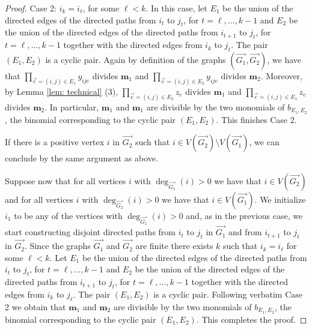 \documentclass[11pt]{article}
\theoremstyle{definition}
\numberwithin{equation}{section}
\begin{document}
\begin{proof}
     {\sf Case 2:} $i_k=i_{\ell}$, for some ${\ell}<k$. In this case, let $E_1$ be the union of the directed edges of the directed paths from $i_{t}$ to $j_{t}$, for $t=\ell,\dots,k-1$ and $E_2$ be the union of the directed edges of the directed paths from $i_{t+1}$ to $j_t$, for $t=\ell,\dots,k-1$ together with the directed edges from $i_{k}$ to $j_{\ell}$. The pair $(E_1,E_2)$ is a cyclic pair. Again by definition of the graphs $(\overrightarrow{G_1},\overrightarrow{G_2})$, we have that $\prod_{\overset{\to}{e}=(i,j)\in E_1}y_{ije}$ divides $\mathbf{m}_1$ and $\prod_{\overset{\to}{e}=(i,j)\in E_2}y_{ije}$ divides $\mathbf{m}_2$. Moreover, by Lemma \ref{lem: technical} (3), $\prod_{\overset{\to}{e}=(i,j)\in E_2} z_e$ divides $\mathbf{m}_1$ and $\prod_{\overset{\to}{e}=(i,j)\in E_1} z_e$ divides $\mathbf{m}_2$. In particular, $\mathbf{m}_1$ and $\mathbf{m}_1$ are divisible by the two monomials of $b_{E_1,E_2}$, the binomial corresponding to the cyclic pair $(E_1,E_2)$. This finishes Case 2.
     
     If there is a positive vertex $i$ in $\overrightarrow{G_2}$ such that  $i\in V(\overrightarrow{G_2})\setminus V(\overrightarrow{G_1})$, we can conclude by the same argument as above. 
     
     Suppose now that for all vertices $i$ with $\deg_{\overrightarrow{G_1}}(i)>0$ we have that $i\in V(\overrightarrow{G_2})$ and for all vertices $i$ with $\deg_{\overrightarrow{G_2}}(i)>0$ we have that $i\in V(\overrightarrow{G_1})$. We initialize $i_1$ to be any of the vertices with $\deg_{\overrightarrow{G_1}}(i)>0$ and, as in the previous case, we start constructing disjoint directed paths from $i_t$ to $j_{t}$ in $\overrightarrow{G_1}$ and from $i_{t+1}$ to $j_{t}$ in $\overrightarrow{G_2}$. Since the graphs $\overrightarrow{G_1}$ and $\overrightarrow{G_2}$ are finite there exists $k$ such that $i_k=i_{\ell}$ for some $\ell<k$. Let $E_1$ be the union of the directed edges of the directed paths from $i_{t}$ to $j_{t}$, for $t=\ell,\dots,k-1$ and $E_2$ be the union of the directed edges of the directed paths from $i_{t+1}$ to $j_t$, for $t=\ell,\dots,k-1$ together with the directed edges from $i_{k}$ to $j_{\ell}$. The pair $(E_1,E_2)$ is a cyclic pair. Following verbatim Case 2 we obtain that $\mathbf{m}_1$ and $\mathbf{m}_2$ are divisible by the two monomials of $b_{E_1,E_2}$, the binomial corresponding to the cyclic pair $(E_1,E_2)$.
     This completes the proof.
\end{proof}

\end{document}

